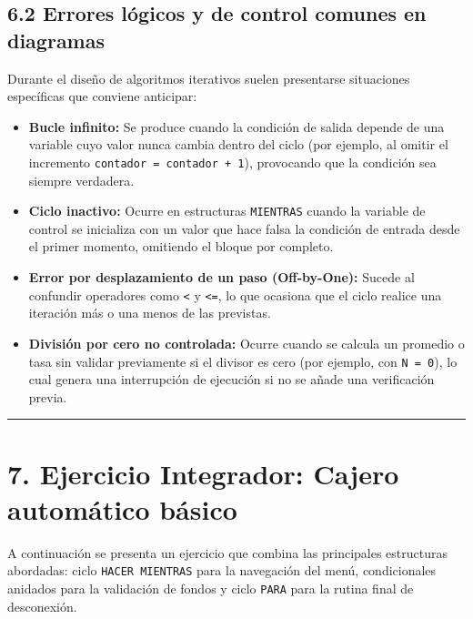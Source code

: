 \subsection{6.2 Errores lógicos y de control comunes en
diagramas}\label{errores-luxf3gicos-y-de-control-comunes-en-diagramas}

Durante el diseño de algoritmos iterativos suelen presentarse
situaciones específicas que conviene anticipar:

\begin{itemize}
\tightlist
\item
  \textbf{Bucle infinito:} Se produce cuando la condición de salida
  depende de una variable cuyo valor nunca cambia dentro del ciclo (por
  ejemplo, al omitir el incremento
  \texttt{contador\ =\ contador\ +\ 1}), provocando que la condición sea
  siempre verdadera.
\item
  \textbf{Ciclo inactivo:} Ocurre en estructuras \texttt{MIENTRAS}
  cuando la variable de control se inicializa con un valor que hace
  falsa la condición de entrada desde el primer momento, omitiendo el
  bloque por completo.
\item
  \textbf{Error por desplazamiento de un paso (Off-by-One):} Sucede al
  confundir operadores como \texttt{\textless{}} y
  \texttt{\textless{}=}, lo que ocasiona que el ciclo realice una
  iteración más o una menos de las previstas.
\item
  \textbf{División por cero no controlada:} Ocurre cuando se calcula un
  promedio o tasa sin validar previamente si el divisor es cero (por
  ejemplo, con \texttt{N\ =\ 0}), lo cual genera una interrupción de
  ejecución si no se añade una verificación previa.
\end{itemize}

\begin{center}\rule{0.5\linewidth}{0.5pt}\end{center}

\section{7. Ejercicio Integrador: Cajero automático
básico}\label{ejercicio-integrador-cajero-automuxe1tico-buxe1sico}

A continuación se presenta un ejercicio que combina las principales
estructuras abordadas: ciclo \texttt{HACER\ MIENTRAS} para la navegación
del menú, condicionales anidados para la validación de fondos y ciclo
\texttt{PARA} para la rutina final de desconexión.

